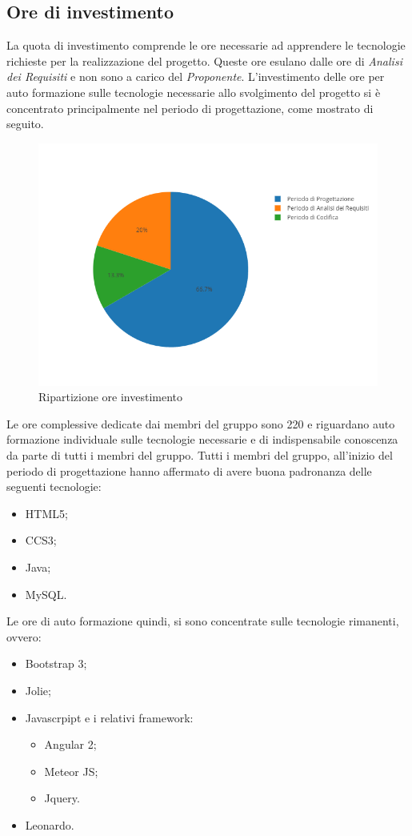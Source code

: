 \subsection{Ore di investimento}
La quota di investimento comprende le ore necessarie ad apprendere le tecnologie richieste per la realizzazione del progetto. Queste ore esulano dalle ore di \textit{Analisi dei Requisiti} e non sono a carico del \textit{Proponente}. L'investimento delle ore per auto formazione sulle tecnologie necessarie allo svolgimento del progetto si è concentrato principalmente nel periodo di progettazione, come mostrato di seguito.
\begin{figure}
	\centering
	\includegraphics[scale=0.6]{img/ore_investimento_periodi}
	\caption{Ripartizione ore investimento}
	\label{fig:oreinvestimentoperiodi}
\end{figure}
Le ore complessive dedicate dai membri del gruppo sono 220 e riguardano auto formazione individuale sulle tecnologie necessarie e di indispensabile conoscenza da parte di tutti i membri del gruppo. Tutti i membri del gruppo, all'inizio del periodo di progettazione hanno affermato di avere buona padronanza delle seguenti tecnologie:
\begin{itemize}
	\item HTML5;
	\item CCS3;
	\item Java;
	\item MySQL.
\end{itemize}
Le ore di auto formazione quindi, si sono concentrate sulle tecnologie rimanenti, ovvero:
\begin{itemize}
	\item Bootstrap 3;
	\item Jolie;
	\item Javascrpipt e i relativi framework:
	\begin{itemize}
		\item Angular 2;
		\item Meteor JS;
		\item Jquery.
	\end{itemize}
	\item Leonardo.
\end{itemize}

